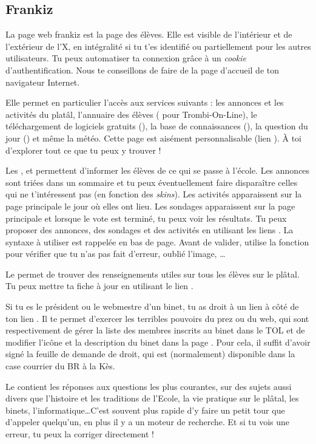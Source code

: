 \subsection{Frankiz}
\label{frankiz} La page web frankiz est la page des élèves. Elle est visible de l'intérieur et de
l'extérieur de l'X, en intégralité si tu t'es identifié ou partiellement pour les autres
utilisateurs. Tu peux automatiser ta connexion grâce à un \emph{cookie} d'authentification. Nous te
conseillons de faire de  la page d'accueil de ton navigateur Internet.

Elle permet en particulier l'accès aux services suivants : les
annonces et les activités du platâl, l'annuaire des élèves
( pour Trombi-On-Line), le téléchargement de logiciels
gratuits (), la base de connaissances (),
la question du jour () et même la météo. Cette page est
aisément personnalisable (lien ). À toi d'explorer
tout ce que tu peux y trouver !

Les ,  et  permettent d'informer les élèves de ce qui se passe à l'école. Les annonces sont triées dans
un sommaire et tu peux éventuellement faire disparaître celles qui ne t'intéressent pas (en fonction des \emph{skins}). Les activités apparaissent
sur la page principale le jour où elles ont lieu. Les sondages apparaissent sur la page principale et lorsque le vote est terminé, tu peux voir les
résultats. Tu peux proposer des annonces, des sondages et des activités en utilisant les liens . La syntaxe à utiliser est
rappelée en bas de page. Avant de valider, utilise la fonction  pour vérifier que tu n'as pas fait d'erreur, oublié l'image, \dots

Le  permet de trouver des renseignements utiles sur
tous les élèves sur le plâtal. Tu peux mettre ta fiche à jour en
utilisant le lien .

Si tu es le président ou le webmestre d'un binet, tu as droit à un
lien  à c\^oté de ton lien .
Il te permet d'exercer les terribles pouvoirs du prez ou du web, qui
sont respectivement de gérer la liste des membres inscrits au binet
dans le TOL et de modifier l'ic\^one et la description du binet dans
la page . Pour cela, il suffit d'avoir signé la feuille
de demande de droit, qui est (normalement) disponible dans la case
courrier du BR à la Kès.

Le  contient les réponses aux questions les plus courantes, sur des sujets aussi divers que l'histoire et les traditions de l'Ecole, la
vie pratique sur le plâtal, les binets, l'informatique\dots C'est souvent plus rapide d'y faire un petit tour que d'appeler quelqu'un, en plus il y a
un moteur de recherche. Et si tu vois une erreur, tu peux la corriger directement !

